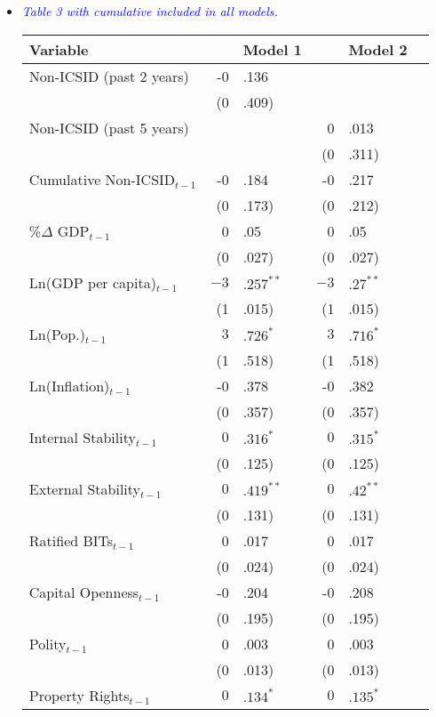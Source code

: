 \begin{enumerate}
\begin{itemize}
		\clearpage
		\item \textcolor{blue}{ \emph{ Table 3 with cumulative included in all models. }}

			\begin{table}[ht]
			\centering
			\begingroup\footnotesize
			\begin{tabular}{lr@{} lr@{}lr@{}}
			 Variable && Model 1 && Model 2 \\ 
			  \hline
			\hline
			Non-ICSID (past 2 years) & -0&.136 &&  \\ 
			   & (0&.409) &&  \\ 
			  Non-ICSID (past 5 years) &  && 0&.013 \\ 
			   &  && (0&.311) \\ 
			  Cumulative Non-ICSID$_{t-1}$ & -0&.184 & -0&.217 \\ 
			   & (0&.173) & (0&.212) \\ 
			  \%$\Delta$ GDP$_{t-1}$ & 0&.05 & 0&.05 \\ 
			   & (0&.027) & (0&.027) \\ 
			  Ln(GDP per capita)$_{t-1}$ & $-3$&$.257^{\ast\ast}$ & $-3$&$.27^{\ast\ast}$ \\ 
			   & (1&.015) & (1&.015) \\ 
			  Ln(Pop.)$_{t-1}$ & $3$&$.726^{\ast}$ & $3$&$.716^{\ast}$ \\ 
			   & (1&.518) & (1&.518) \\ 
			  Ln(Inflation)$_{t-1}$ & -0&.378 & -0&.382 \\ 
			   & (0&.357) & (0&.357) \\ 
			  Internal Stability$_{t-1}$ & $0$&$.316^{\ast}$ & $0$&$.315^{\ast}$ \\ 
			   & (0&.125) & (0&.125) \\ 
			  External Stability$_{t-1}$ & $0$&$.419^{\ast\ast}$ & $0$&$.42^{\ast\ast}$ \\ 
			   & (0&.131) & (0&.131) \\ 
			  Ratified BITs$_{t-1}$ & 0&.017 & 0&.017 \\ 
			   & (0&.024) & (0&.024) \\ 
			  Capital Openness$_{t-1}$ & -0&.204 & -0&.208 \\ 
			   & (0&.195) & (0&.195) \\ 
			  Polity$_{t-1}$ & 0&.003 & 0&.003 \\ 
			   & (0&.013) & (0&.013) \\ 
			  Property Rights$_{t-1}$ & $0$&$.134^{\ast}$ & $0$&$.135^{\ast}$ \\ 

\end{tabular}
\end{table}
\end{itemize}
\end{enumerate}
